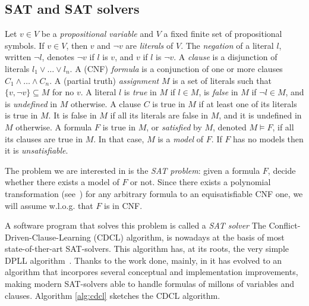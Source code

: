 \documentclass{llncs}
\begin{document}
\subsection{SAT and SAT solvers}
Let $v \in V $ be a \emph{propositional variable} and $V$
 a fixed finite set of propositional symbols.  If $v \in V$,
then $v$ and $\lnot v$ are \emph{literals} of $V$.  
The \emph{negation} of a literal $l$, written $\lnot l$, denotes 
$\lnot v$ if $l$ is $v$, and $v$ if $l$ is $\lnot v$.
A \emph{clause} is a disjunction of literals $l_1 \lor\ldots\lor l_n$.
A (CNF) \emph{formula} is a conjunction of one or
more clauses $C_1 \land\ldots\land C_n$. 
 A (partial truth) \emph{assignment} $M$ is a
set of literals such that $\{ v, \lnot v \} \subseteq M$ for no $v$. A
literal $l$ is \emph{true} in $M$ if $l \in M$, is \emph{false} in $M$
if $\lnot l \in M$, and is \emph{undefined} in $M$ otherwise. 
A clause $C$ is true in $M$ if at least one of its
literals is true in $M$.  It is false in $M$ if all its literals are
false in $M$, and it is undefined in $M$ otherwise. 
A formula $F$ is true in $M$, or
\emph{satisfied} by $M$, denoted $M\models F$, if all its clauses are
true in $M$.  In that case, $M$ is a \emph{model} of $F$.  If $F$ has
no models then it is \emph{unsatisfiable}.  

The problem we are interested in is the \emph{SAT problem}: given a
formula $F$, decide whether there exists a model of $F$ or not.
Since there exists a polynomial transformation
(see~\cite{Tseitin1968}) for any arbitrary formula to an
equisatisfiable CNF one, we will assume w.l.o.g. that $F$ is in CNF.

A software program that solves this problem is called a \emph{SAT solver}
The Conflict-Driven-Clause-Learning (CDCL) algorithm, is nowadays at the 
basis of most state-of-ther-art SAT-solvers\cite{gluclose,plingeling,cryptominisat}. 
This algorithm has, at its roots, the very 
simple DPLL algorithm~\cite{Davisetal1962CACM}. Thanks to the work done, mainly,
 in \cite{relsat,Chaff2001,GRASP1999IEEE,ZhangStickel1996AIMATH,EenSorensson2003SAT,picosat2008} it has evolved
 to an algorithm that incorpores several conceptual and implementation 
improvements, making modern SAT-solvers able to handle formulas of millons 
of variables and clauses. Algorithm \ref{alg:cdcl} sketches the CDCL algorithm.
\end{document}
